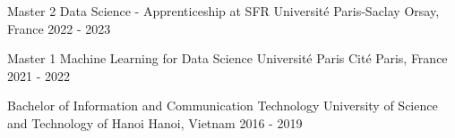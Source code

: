 

\begin{cventries}
\renewcommand*{\acvPositionCase}[1]{#1} %

  \cventry
    {Master 2 Data Science - Apprenticeship at SFR} %
    {Université Paris-Saclay} %
    {Orsay, France} %
    {2022 - 2023} %
    {}

  \cventry
    {Master 1 Machine Learning for Data Science} %
    {Université Paris Cité} %
    {Paris, France} %
    {2021 - 2022} %
    {}

  \cventry
    {Bachelor of Information and Communication Technology} %
    {University of Science and Technology of Hanoi} %
    {Hanoi, Vietnam} %
    {2016 - 2019} %
    {}

\end{cventries}

